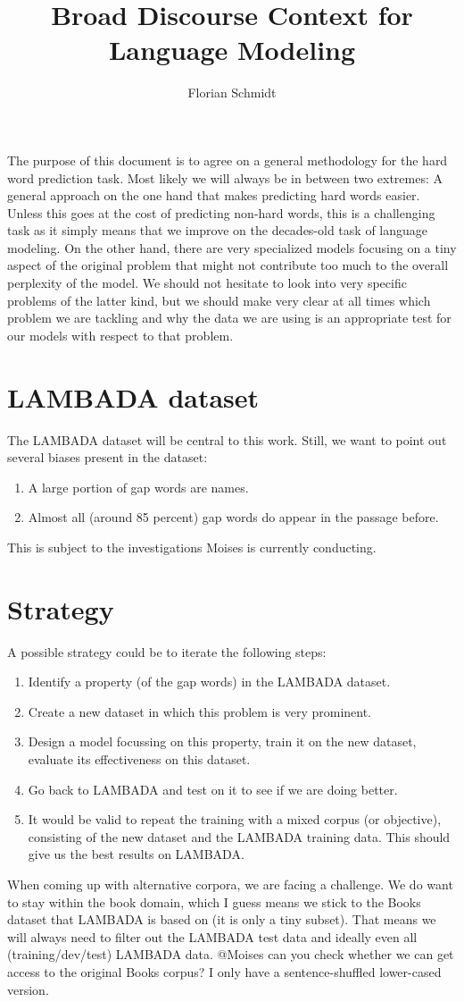 \documentclass[a4paper,10pt]{article}
\title{Broad Discourse Context for Language Modeling}
\author{Florian Schmidt}
\begin{document}
\maketitle
The purpose of this document is to agree on a general methodology for the hard word prediction task. Most likely we will always be in between two extremes: A general approach on the one hand that makes predicting hard words easier. Unless this goes at the cost of predicting non-hard words, this is a challenging task as it simply means that we improve on the decades-old task of language modeling. On the other hand, there are very specialized models focusing on a tiny aspect of the original problem that might not contribute too much to the overall perplexity of the model. We should not hesitate to look into very specific problems of the latter kind, but we should make very clear at all times which problem we are tackling and why the data we are using is an appropriate test for our models with respect to that problem.
\section{LAMBADA dataset}
The LAMBADA dataset will be central to this work. Still, we want to point out several biases present in the dataset:
\begin{enumerate}
	\item A large portion of gap words are names.
	\item Almost all (around 85 percent) gap words do appear in the passage before.
\end{enumerate}
This is subject to the investigations Moises is currently conducting.
\section{Strategy}
A possible strategy could be to iterate the following steps:
\begin{enumerate}
	\item Identify a property (of the gap words) in the LAMBADA dataset.
	\item Create a new dataset in which this problem is very prominent. 
	\item Design a model focussing on this property, train it on the new dataset, evaluate its effectiveness on this dataset.
	\item Go back to LAMBADA and test on it to see if we are doing better.
	\item It would be valid to repeat the training with a mixed corpus (or objective), consisting of the new dataset and the LAMBADA training data. This should give us the best results on LAMBADA.
\end{enumerate}
When coming up with alternative corpora, we are facing a challenge. We do want to stay within the book domain, which I guess means we stick to the Books dataset that LAMBADA is based on (it is only a tiny subset). That means we will always need to filter out the LAMBADA test data and ideally even all (training/dev/test) LAMBADA data. @Moises can you check whether we can get access to the original Books corpus? I only have a sentence-shuffled lower-cased version.
\end{document}
